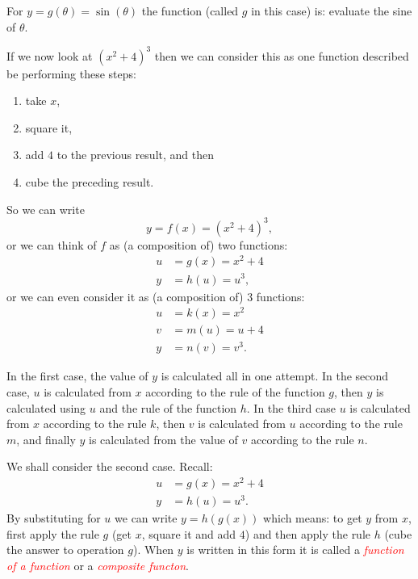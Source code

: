 \documentclass[
  11pt,
  oneside]{book}
\providecommand{\tightlist}{%
  \setlength{\itemsep}{0pt}\setlength{\parskip}{0pt}}
\newcommand{\slide}{}
\theoremstyle{definition}
\theoremstyle{definition}
\theoremstyle{definition}
\theoremstyle{definition}
\theoremstyle{remark}
\begin{document}
For \(y = g(\theta) = \sin(\theta)\) the function (called \(g\) in this case) is: evaluate the sine of \(\theta\).

If we now look at \((x^2 + 4)^3\) then we can consider this as one function described be performing these steps:

\begin{enumerate}
\def\labelenumi{\arabic{enumi}.}
\tightlist
\item
  take \(x\),
\item
  square it,
\item
  add \(4\) to the previous result, and then
\item
  cube the preceding result.
\end{enumerate}

\slide

So we can write
\[
y = f(x) = (x^2+ 4)^3,
\]
or we can think of \(f\) as (a composition of) two functions:
\begin{align*}
u &= g(x) = x^2 + 4\\
y &= h(u) = u^3,
\end{align*}
or we can even consider it as (a composition of) 3 functions:
\begin{align*}
u &= k(x) = x^2\\
v &= m(u) = u + 4\\
y &= n(v) = v^3.
\end{align*}
\slide
In the first case, the value of \(y\) is calculated all in one attempt. In the second case, \(u\) is calculated from \(x\) according to the rule of the function \(g\), then \(y\) is calculated using \(u\) and the rule of the function \(h\). In the third case \(u\) is calculated from \(x\) according to the rule \(k\), then \(v\) is calculated from \(u\) according to the rule \(m\), and finally \(y\) is calculated from the value of \(v\) according to the rule \(n\).

We shall consider the second case. Recall:
\begin{align*}
u &= g(x) = x^2+ 4\\
y &= h(u) = u^3.
\end{align*}
By substituting for \(u\) we can write \(y = h(g(x))\) which means: to get \(y\) from \(x\), first apply the rule \(g\) (get \(x\), square it and add \(4\)) and then apply the rule \(h\) (cube the answer to operation \(g\)). When \(y\) is written in this form it is called a \textcolor{red}{\em function of a function} or a \textcolor{red}{\em composite functon}.
\slide
\end{document}

